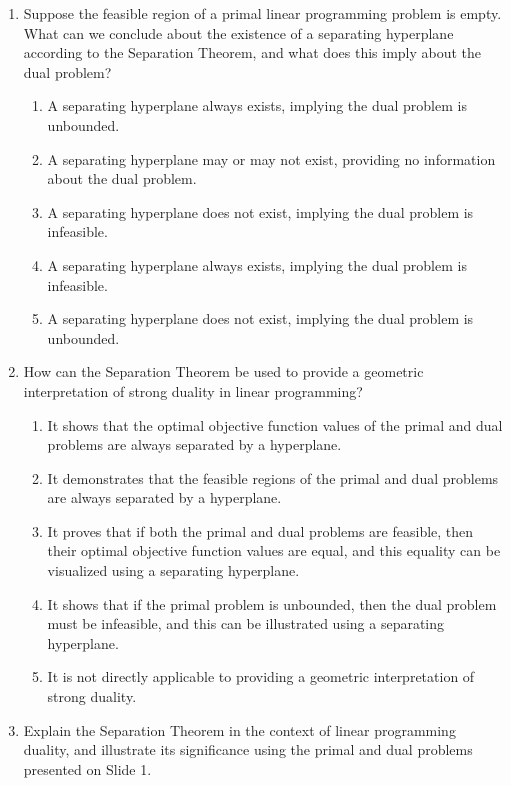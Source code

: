 \documentclass{article}%
\begin{document}
\begin{enumerate}
\begin{enumerate}
\item It states that the optimal solutions of the primal and dual problems are always separated by a hyperplane.%
\end{enumerate}%
\vspace{1em}%
\item Suppose the feasible region of a primal linear programming problem is empty.  What can we conclude about the existence of a separating hyperplane according to the Separation Theorem, and what does this imply about the dual problem?%
\begin{enumerate}%
\item A separating hyperplane always exists, implying the dual problem is unbounded.%
\item A separating hyperplane may or may not exist, providing no information about the dual problem.%
\item A separating hyperplane does not exist, implying the dual problem is infeasible.%
\item A separating hyperplane always exists, implying the dual problem is infeasible.%
\item A separating hyperplane does not exist, implying the dual problem is unbounded.%
\end{enumerate}%
\vspace{1em}%
\item How can the Separation Theorem be used to provide a geometric interpretation of strong duality in linear programming?%
\begin{enumerate}%
\item It shows that the optimal objective function values of the primal and dual problems are always separated by a hyperplane.%
\item It demonstrates that the feasible regions of the primal and dual problems are always separated by a hyperplane.%
\item It proves that if both the primal and dual problems are feasible, then their optimal objective function values are equal, and this equality can be visualized using a separating hyperplane.%
\item It shows that if the primal problem is unbounded, then the dual problem must be infeasible, and this can be illustrated using a separating hyperplane.%
\item It is not directly applicable to providing a geometric interpretation of strong duality.%
\end{enumerate}%
\vspace{1em}%
\item Explain the Separation Theorem in the context of linear programming duality, and illustrate its significance using the primal and dual problems presented on Slide 1.%

\end{enumerate}
\end{document}
